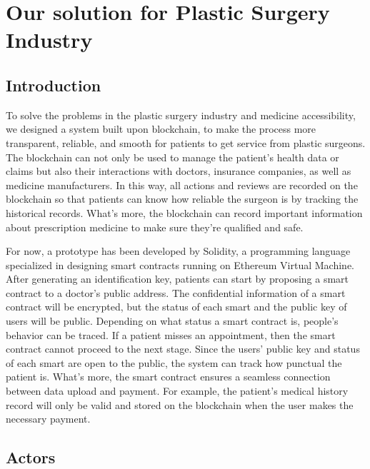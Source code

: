 \documentclass{article}
\begin{document}
\section{Our solution for Plastic Surgery Industry}
\subsection{Introduction}
To solve the problems in the plastic surgery industry and medicine accessibility, we designed a system built upon blockchain, to make the process more transparent, reliable, and smooth for patients to get service from plastic surgeons. The blockchain can not only be used to manage the patient's health data or claims but also their interactions with doctors, insurance companies, as well as medicine manufacturers. In this way, all actions and reviews are recorded on the blockchain so that patients can know how reliable the surgeon is by tracking the historical records. What's more, the blockchain can record important information about prescription medicine to make sure they're qualified and safe.
\par For now, a prototype has been developed by Solidity, a programming language specialized in designing smart contracts running on Ethereum Virtual Machine. After generating an identification key, patients can start by proposing a smart contract to a doctor's public address. The confidential information of a smart contract will be encrypted, but the status of each smart and the public key of users will be public. Depending on what status a smart contract is, people's behavior can be traced. If a patient misses an appointment, then the smart contract cannot proceed to the next stage. Since the users' public key and status of each smart are open to the public, the system can track how punctual the patient is. What's more, the smart contract ensures a seamless connection between data upload and payment. For example, the patient's medical history record will only be valid and stored on the blockchain when the user makes the necessary payment.
\subsection{Actors}
\end{document}
